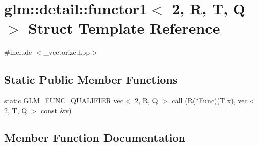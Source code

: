 \hypertarget{structglm_1_1detail_1_1functor1_3_012_00_01_r_00_01_t_00_01_q_01_4}{}\section{glm\+:\+:detail\+:\+:functor1$<$ 2, R, T, Q $>$ Struct Template Reference}
\label{structglm_1_1detail_1_1functor1_3_012_00_01_r_00_01_t_00_01_q_01_4}


{\ttfamily \#include $<$\+\_\+vectorize.\+hpp$>$}

\subsection*{Static Public Member Functions}
\begin{DoxyCompactItemize}
\item 
static \mbox{\hyperlink{setup_8hpp_a33fdea6f91c5f834105f7415e2a64407}{G\+L\+M\+\_\+\+F\+U\+N\+C\+\_\+\+Q\+U\+A\+L\+I\+F\+I\+ER}} \mbox{\hyperlink{structglm_1_1vec}{vec}}$<$ 2, R, Q $>$ \mbox{\hyperlink{structglm_1_1detail_1_1functor1_3_012_00_01_r_00_01_t_00_01_q_01_4_a99959412228366dac1483414dcde0092}{call}} (R($\ast$Func)(T \mbox{\hyperlink{_s_d_l__opengl_8h_ad0e63d0edcdbd3d79554076bf309fd47}{x}}), \mbox{\hyperlink{structglm_1_1vec}{vec}}$<$ 2, T, Q $>$ const \&\mbox{\hyperlink{_s_d_l__opengl_8h_a10a82eabcb59d2fcd74acee063775f90}{v}})
\end{DoxyCompactItemize}


\subsection{Member Function Documentation}
\mbox{\label{structglm_1_1detail_1_1functor1_3_012_00_01_r_00_01_t_00_01_q_01_4_a99959412228366dac1483414dcde0092}} 
